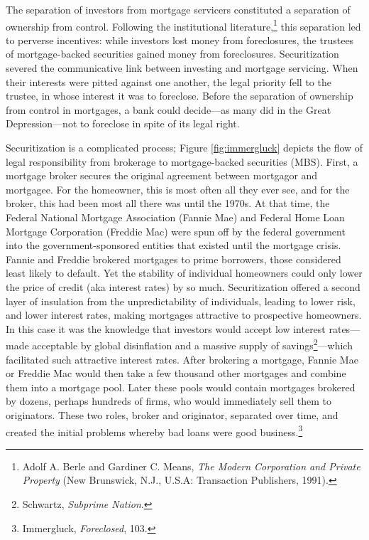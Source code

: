 \documentclass[12pt,oneside]{psthesis}
\begin{document}
The separation of investors from mortgage servicers constituted a separation of ownership from control.
Following the institutional literature,\footnote{Adolf A. Berle and Gardiner C. Means, \emph{The Modern Corporation and Private Property} (New Brunswick, N.J., U.S.A: Transaction Publishers, 1991).} this separation led to perverse incentives: while investors lost money from foreclosures, the trustees of mortgage-backed securities gained money from foreclosures.
Securitization severed the communicative link between investing and mortgage servicing.
When their interests were pitted against one another, the legal priority fell to the trustee, in whose interest it was to foreclose.
Before the separation of ownership from control in mortgages, a bank could decide---as many did in the Great Depression---not to foreclose in spite of its legal right.

Securitization is a complicated process; Figure \ref{fig:immergluck} depicts the flow of legal responsibility from brokerage to mortgage-backed securities (MBS).
First, a mortgage broker secures the original agreement between mortgagor and mortgagee.
For the homeowner, this is most often all they ever see, and for the broker, this had been most all there was until the 1970s.
At that time, the Federal National Mortgage Association (Fannie Mae) and Federal Home Loan Mortgage Corporation (Freddie Mac) were spun off by the federal government into the government-sponsored entities that existed until the mortgage crisis.
Fannie and Freddie brokered mortgages to prime borrowers, those considered least likely to default.
Yet the stability of individual homeowners could only lower the price of credit (aka interest rates) by so much.
Securitization offered a second layer of insulation from the unpredictability of individuals, leading to lower risk, and lower interest rates, making mortgages attractive to prospective homeowners.
In this case it was the knowledge that investors would accept low interest rates---made acceptable by global disinflation and a massive supply of savings\footnote{Schwartz, \emph{Subprime Nation}.}---which facilitated such attractive interest rates.
After brokering a mortgage, Fannie Mae or Freddie Mac would then take a few thousand other mortgages and combine them into a mortgage pool.
Later these pools would contain mortgages brokered by dozens, perhaps hundreds of firms, who would immediately sell them to originators.
These two roles, broker and originator, separated over time, and created the initial problems whereby bad loans were good business.\footnote{Immergluck, \emph{Foreclosed}, 103.}
\end{document}
